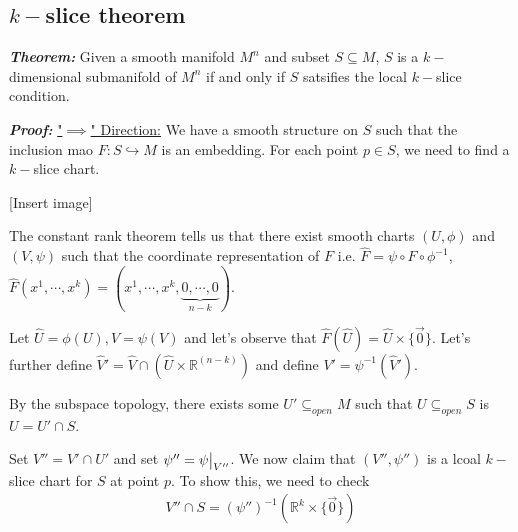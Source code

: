 \documentclass{article}
\newcommand{\R}{\mathbb{R}}
\newcommand{\restr}[2]{{%
  \left.\kern-\nulldelimiterspace %
  #1 %
  \vphantom{\big|} %
  \right|_{#2} %
  }}
\begin{document}
\vskip 1cm
\subsection{$k-$slice theorem}

\begin{dottedbox}
\emph{\textbf{Theorem:}} Given a smooth manifold $M^n$ and subset $S \subseteq M$, $S$ is a $k-$dimensional submanifold of $M^n$ if and only if $S$ satsifies the local $k-$slice condition.
\end{dottedbox}

\vskip 0.5cm
\emph{\textbf{Proof:}}
\vskip 0.5cm
\underline{"$\implies$" Direction:} We have a smooth structure on $S$ such that the inclusion mao $F : S \hookrightarrow M$ is an embedding. For each point $p \in S$, we need to find a $k-$slice chart.

\vskip 0.5cm
[Insert image]

\vskip 0.5cm
The constant rank theorem tells us that there exist smooth charts $(U, \phi)$ and $(V, \psi)$ such that the coordinate representation of $F$ i.e. $\hat{F} = \psi \circ F \circ \phi^{-1}$, $\hat{F}(x^1, \cdots, x^k) = (x^1, \cdots, x^k, \underbrace{0, \cdots, 0}_{n - k})$. 

\vskip 0.5cm
Let $\hat{U} = \phi(U), \hat{V} = \psi(V)$ and let's observe that $\hat{F}(\hat{U}) = \hat{U} \times \{\vec{0}\}$. Let's further define $\hat{V}' = \hat{V} \cap \left( \hat{U} \times \R^{(n-k)} \right)$ and define $V' = \psi^{-1}(\hat{V}')$. 

\vskip 0.5cm
By the subspace topology, there exists some $U' \subseteq_{open} M$ such that $U \subseteq_{open} S$ is $U = U' \cap S$.

\vskip 0.5cm
Set $V'' = V' \cap U'$ and set $\psi'' = \restr{\psi}{V''}$. We now claim that $(V'', \psi'')$ is a lcoal $k-$slice chart for $S$ at point $p$. To show this, we need to check 
\begin{align*}
  V'' \cap S = \left( \psi'' \right)^{-1} \left( \R^k \times \{\vec{0}\}\right)
\end{align*}
\end{document}
